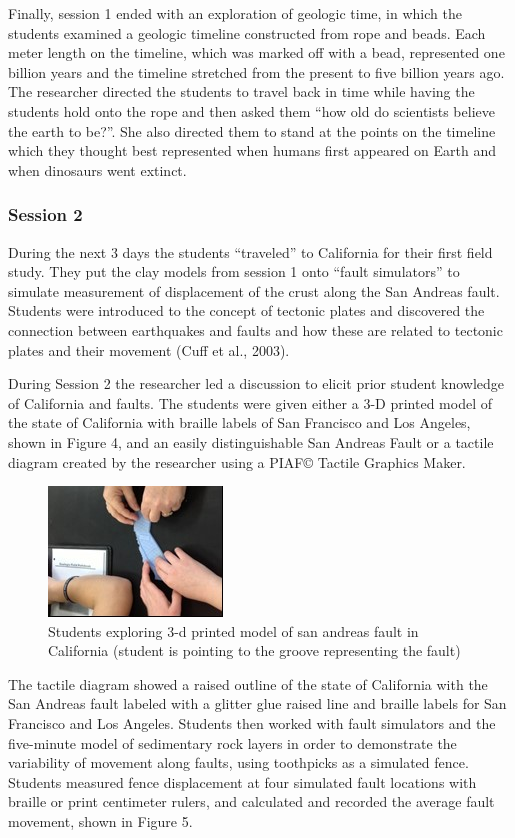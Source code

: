 \documentclass[11.5pt]{sig-alternate} %
\begin{document}
\begin{large}
Finally, session 1 ended with an exploration of geologic time, in which the students examined a geologic timeline constructed from rope and beads. Each meter length on the timeline, which was marked off with a bead, represented one billion years and the timeline stretched from the present to five billion years ago.  The researcher directed the students to travel back in time while having the students hold onto the rope and then asked them “how old do scientists believe the earth to be?”.  She also directed them to stand at the points on the timeline which they thought best represented when humans first appeared on Earth and when dinosaurs went extinct.  
 
\subsubsection*{Session 2}

During the next 3 days the students “traveled” to California for their first field study.  They put the clay models from session 1 onto “fault simulators” to simulate measurement of displacement of the crust along the San Andreas fault.  Students were introduced to the concept of tectonic plates and discovered the connection between earthquakes and faults and how these are related to tectonic plates and their movement (Cuff et al., 2003).

During Session 2 the researcher led a discussion to elicit prior student knowledge of California and faults.  The students were given either a 3-D printed model of the state of California with braille labels of San Francisco and Los Angeles, shown in Figure 4, and an easily distinguishable San Andreas Fault or a tactile diagram created by the researcher using a PIAF© Tactile Graphics Maker.  
 
\begin{figure}[h]
    \centering
    \includegraphics{images/fig4.jpg}
    \caption{ Students exploring 3-d printed model of san andreas fault in California (student is pointing to the groove representing the fault)}
\end{figure}

The tactile diagram showed a raised outline of the state of California with the San Andreas fault labeled with a glitter glue raised line and braille labels for San Francisco and Los Angeles.  Students then worked with fault simulators and the five-minute model of sedimentary rock layers in order to demonstrate the variability of movement along faults, using toothpicks as a simulated fence.  Students measured fence displacement at four simulated fault locations with braille or print centimeter rulers, and calculated and recorded the average fault movement, shown in Figure 5.  
 

\end{large}
\end{document}
